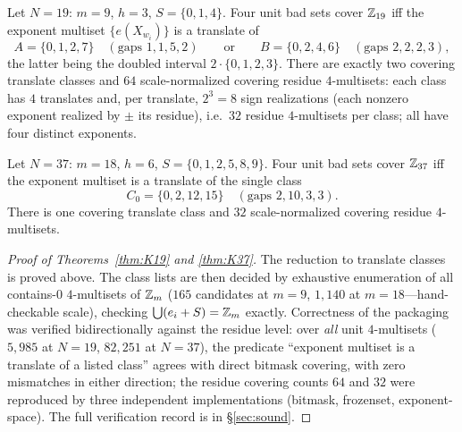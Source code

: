 \begin{theorem}[$K_{19}$]\label{thm:K19}
Let $N=19$: $m=9$, $h=3$, $S=\{0,1,4\}$. Four unit bad sets cover
$\mathbb{Z}_{19}$ iff the exponent multiset $\{e(X_{w_i})\}$ is a translate of
\[
A=\{0,1,2,7\}\quad(\text{gaps }1,1,5,2)
\qquad\text{or}\qquad
B=\{0,2,4,6\}\quad(\text{gaps }2,2,2,3),
\]
the latter being the doubled interval $2\cdot\{0,1,2,3\}$. There are
exactly two covering translate classes and $64$ scale-normalized covering
residue $4$-multisets: each class has $4$ translates and, per translate,
$2^3=8$ sign realizations (each nonzero exponent realized by $\pm$ its
residue), i.e.\ $32$ residue $4$-multisets per class; all have four
distinct exponents.
\end{theorem}

\begin{theorem}[$K_{37}$]\label{thm:K37}
Let $N=37$: $m=18$, $h=6$, $S=\{0,1,2,5,8,9\}$. Four unit bad sets cover
$\mathbb{Z}_{37}$ iff the exponent multiset is a translate of the single class
\[
C_0=\{0,2,12,15\}\quad(\text{gaps }2,10,3,3).
\]
There is one covering translate class and $32$ scale-normalized covering
residue $4$-multisets.
\end{theorem}

\begin{proof}[Proof of Theorems~\ref{thm:K19} and \ref{thm:K37}]
The reduction to translate classes is proved above. The class lists are
then decided by exhaustive enumeration of all contains-$0$ $4$-multisets
of $\mathbb{Z}_m$ ($165$ candidates at $m=9$, $1{,}140$ at $m=18$---hand-checkable
scale), checking $\bigcup(e_i+S)=\mathbb{Z}_m$ exactly. Correctness of the
packaging was verified bidirectionally against the residue level: over
\emph{all} unit $4$-multisets ($5{,}985$ at $N=19$, $82{,}251$ at
$N=37$), the predicate ``exponent multiset is a translate of a listed
class'' agrees with direct bitmask covering, with zero mismatches in
either direction; the residue covering counts $64$ and $32$ were
reproduced by three independent implementations (bitmask, frozenset,
exponent-space). The full verification record is in \S\ref{sec:sound}.
\end{proof}

